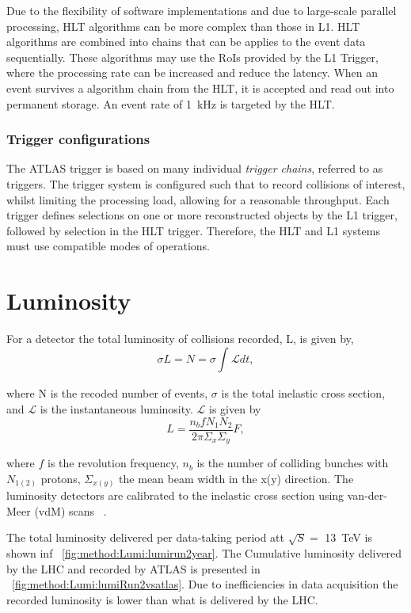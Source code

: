 Due to the flexibility of software implementations and due to large-scale parallel processing, HLT algorithms can be more complex than those in L1. HLT algorithms are combined into chains that can be applies to the event data sequentially. These algorithms may use the RoIs provided by the L1 Trigger, where the processing rate can be increased and reduce the latency. When an event survives a algorithm chain from the HLT, it is accepted and read out into permanent storage. An event rate of \SI{1}{\kilo\hertz} is targeted by the HLT.

\subsubsection{Trigger configurations}

The ATLAS trigger is based on many individual \emph{trigger chains}, referred to as triggers. The trigger system is configured such that to record collisions of interest, whilst limiting the processing load, allowing for a reasonable throughput. Each trigger defines selections on one or more reconstructed objects by the L1 trigger, followed by selection in the HLT trigger. Therefore, the HLT and L1 systems must use compatible modes of operations. 

\section{Luminosity}

For a detector the total luminosity of collisions recorded, L, is given by, 
\begin{equation}
   \sigma L = N = \sigma \int_{}^{} \mathcal{L} dt,
\end{equation}

where N is the recoded number of events, $\sigma$ is the total inelastic cross section, and $\mathcal{L}$ is the instantaneous luminosity. $\mathcal{L}$ is given by~\cite{Herr}
\begin{equation}
    L = \frac{n_b f N_1 N_2 }{2\pi \Sigma_{x} \Sigma_{y}} F,
\end{equation}

where $f$ is the revolution frequency, $n_b$ is the number of colliding bunches with $N_{1(2)}$ protons, $\Sigma_{x(y)}$ the mean beam width in the x(y) direction. The luminosity detectors are calibrated to the inelastic cross section using van-der-Meer (vdM) scans ~\cite{ATLAS:Balagura_2011,ATLAS:vanderMeer:296752}.

The total luminosity delivered per data-taking period att $\sqrt{S} = $ \SI{13}{\tera\electronvolt} is shown inf ~\cref{fig:method:Lumi:lumirun2year}. The Cumulative luminosity delivered by the LHC and recorded by ATLAS is presented in ~\cref{fig:method:Lumi:lumiRun2vsatlas}. Due to inefficiencies in data acquisition the recorded luminosity is lower than what is delivered by the LHC. 

